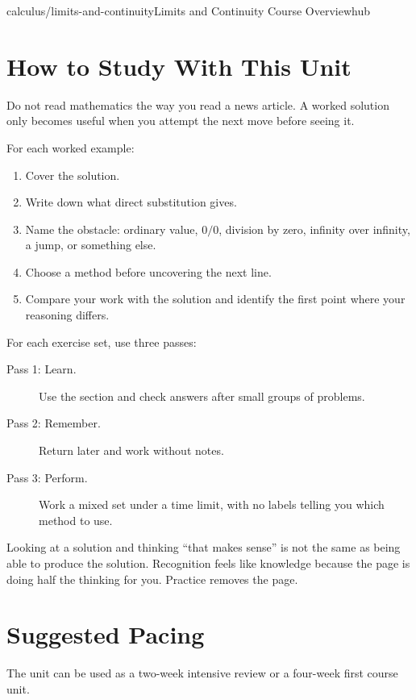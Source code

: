 \documentclass[11pt,openany]{book}
\theoremstyle{bgplain}
\begin{document}
\begin{webpage}{calculus/limits-and-continuity}{Limits and Continuity Course Overview}{hub}
\section*{How to Study With This Unit}

Do not read mathematics the way you read a news article. A worked solution only becomes useful when you attempt the next move before seeing it.

For each worked example:

\begin{enumerate}
  \item Cover the solution.
  \item Write down what direct substitution gives.
  \item Name the obstacle: ordinary value, \(0/0\), division by zero, infinity over infinity, a jump, or something else.
  \item Choose a method before uncovering the next line.
  \item Compare your work with the solution and identify the first point where your reasoning differs.
\end{enumerate}

For each exercise set, use three passes:

\begin{description}
  \item[Pass 1: Learn.] Use the section and check answers after small groups of problems.
  \item[Pass 2: Remember.] Return later and work without notes.
  \item[Pass 3: Perform.] Work a mixed set under a time limit, with no labels telling you which method to use.
\end{description}

\begin{bgsummary}
Looking at a solution and thinking ``that makes sense'' is not the same as being able to produce the solution. Recognition feels like knowledge because the page is doing half the thinking for you. Practice removes the page.
\end{bgsummary}

\section*{Suggested Pacing}

The unit can be used as a two-week intensive review or a four-week first course unit.


\end{webpage}
\end{document}
